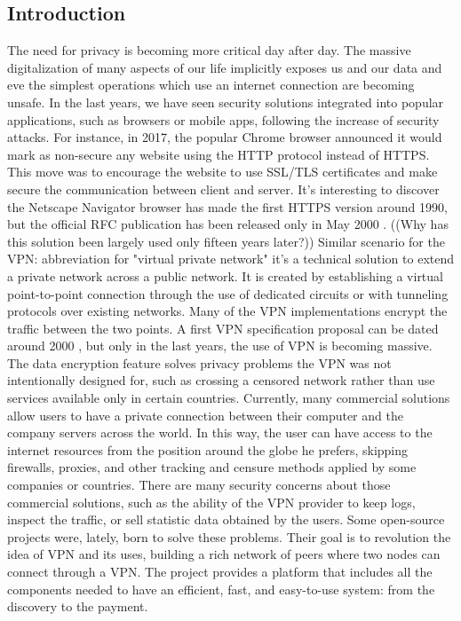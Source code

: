 \documentclass[]{article}
\begin{document}
	\subsection{Introduction}
	The need for privacy is becoming more critical day after day.
	The massive digitalization of many aspects of our life implicitly exposes us and our data and eve the simplest operations which use an internet connection are becoming unsafe.
    In the last years, we have seen security solutions integrated into popular applications, such as browsers or mobile apps, following the increase of security attacks. For instance, in 2017, the popular Chrome browser announced it would mark as non-secure any website using the HTTP protocol instead of HTTPS. This move was to encourage the website to use SSL/TLS certificates and make secure the communication between client and server. It's interesting to discover the Netscape Navigator browser has made the first HTTPS version around 1990, but the official RFC publication has been released only in May 2000 \cite{HTTPS}. ((Why has this solution been largely used only fifteen years later?))
    Similar scenario for the VPN: abbreviation for "virtual private network" it's a technical solution to extend a private network across a public network. It is created by establishing a virtual point-to-point connection through the use of dedicated circuits or with tunneling protocols over existing networks. Many of the VPN implementations encrypt the traffic between the two points. A first VPN specification proposal can be dated around 2000 \cite{VPNRFC}, but only in the last years, the use of VPN is becoming massive. The data encryption feature solves privacy problems the VPN was not intentionally designed for, such as crossing a censored network rather than use services available only in certain countries.
    Currently, many commercial solutions allow users to have a private connection between their computer and the company servers across the world. In this way, the user can have access to the internet resources from the position around the globe he prefers, skipping firewalls, proxies, and other tracking and censure methods applied by some companies or countries.
    There are many security concerns about those commercial solutions, such as the ability of the VPN provider to keep logs, inspect the traffic, or sell statistic data obtained by the users.
    Some open-source projects were, lately, born to solve these problems. Their goal is to revolution the idea of VPN and its uses, building a rich network of peers where two nodes can connect through a VPN. The project provides a platform that includes all the components needed to have an efficient, fast, and easy-to-use system: from the discovery to the payment.
    
\end{document}
